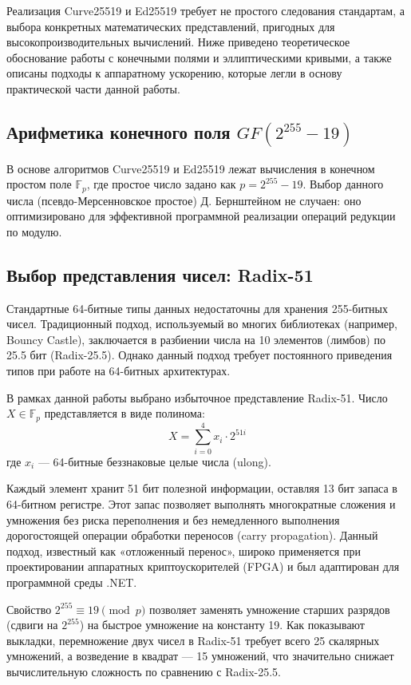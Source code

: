 Реализация Curve25519 и Ed25519 требует не простого следования стандартам, а выбора конкретных математических представлений, пригодных для высокопроизводительных вычислений. Ниже приведено теоретическое обоснование работы с конечными полями и эллиптическими кривыми, а также описаны подходы к аппаратному ускорению, которые легли в основу практической части данной работы.
\subsection{Арифметика конечного поля $GF(2^{255}-19)$}

В основе алгоритмов Curve25519 и Ed25519 лежат вычисления в конечном простом поле $\mathbb{F}_p$, где простое число задано как $p = 2^{255} - 19$. Выбор данного числа (псевдо-Мерсенновское простое) Д. Бернштейном \cite{Bernstein2006Curve25519} не случаен: оно оптимизировано для эффективной программной реализации операций редукции по модулю.

\subsection{Выбор представления чисел: Radix-51}

Стандартные 64-битные типы данных недостаточны для хранения 255-битных чисел. Традиционный подход, используемый во многих библиотеках (например, Bouncy Castle), заключается в разбиении числа на 10 элементов (лимбов) по 25.5 бит (Radix-25.5). Однако данный подход требует постоянного приведения типов при работе на 64-битных архитектурах.

В рамках данной работы выбрано избыточное представление Radix-51. Число $X \in \mathbb{F}_p$ представляется в виде полинома:
\begin{equation}
    X = \sum_{i=0}^{4} x_i \cdot 2^{51i}
\end{equation}
где $x_i$ — 64-битные беззнаковые целые числа (ulong).

Каждый элемент хранит 51 бит полезной информации, оставляя 13 бит запаса в 64-битном регистре. Этот запас позволяет выполнять многократные сложения и умножения без риска переполнения и без немедленного выполнения дорогостоящей операции обработки переносов (carry propagation). Данный подход, известный как «отложенный перенос», широко применяется при проектировании аппаратных криптоускорителей (FPGA) \cite{MdpiFPGA} и был адаптирован для программной среды .NET.

Свойство $2^{255} \equiv 19 \pmod p$ позволяет заменять умножение старших разрядов (сдвиги на $2^{255}$) на быстрое умножение на константу 19. Как показывают выкладки, перемножение двух чисел в Radix-51 требует всего 25 скалярных умножений, а возведение в квадрат — 15 умножений, что значительно снижает вычислительную сложность по сравнению с Radix-25.5.


